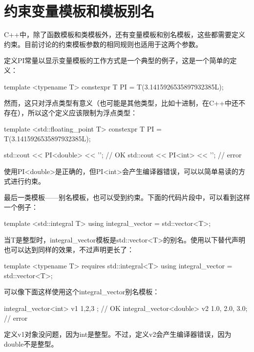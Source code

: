 \section{约束变量模板和模板别名}
C++中，除了函数模板和类模板外，还有变量模板和别名模板，这些都需要定义约束。目前讨论的约束模板参数的相同规则也适用于这两个参数。

定义PI常量以显示变量模板的工作方式是一个典型的例子，这是一个简单的定义：

\begin{cppcode}
template <typename T>
constexpr T PI = T(3.1415926535897932385L);
\end{cppcode}

然而，这只对浮点类型有意义（也可能是其他类型，比如十进制，在C++中还不存在），所以这个定义应该限制为浮点类型：

\begin{cppcode}
template <std::floating_point T>
constexpr T PI = T(3.1415926535897932385L);

std::cout << PI<double> << '\n'; // OK
std::cout << PI<int> << '\n'; // error
\end{cppcode}

使用PI<double>是正确的，但PI<int>会产生编译器错误，可以以简单易读的方式进行约束。

最后一类模板——别名模板，也可以受到约束。下面的代码片段中，可以看到这样一个例子：

\begin{cppcode}
template <std::integral T>
using integral_vector = std::vector<T>;
\end{cppcode}

当T是整型时，integral_vector模板是std::vector<T>的别名。使用以下替代声明也可以达到同样的效果，不过声明更长了：

\begin{cppcode}
template <typename T>
requires std::integral<T>
using integral_vector = std::vector<T>;
\end{cppcode}

可以像下面这样使用这个integral_vector别名模板：

\begin{cppcode}
integral_vector<int> v1 { 1,2,3 }; // OK
integral_vector<double> v2 {1.0, 2.0, 3.0}; // error
\end{cppcode}

定义v1对象没问题，因为int是整型。不过，定义v2会产生编译器错误，因为double不是整型。

